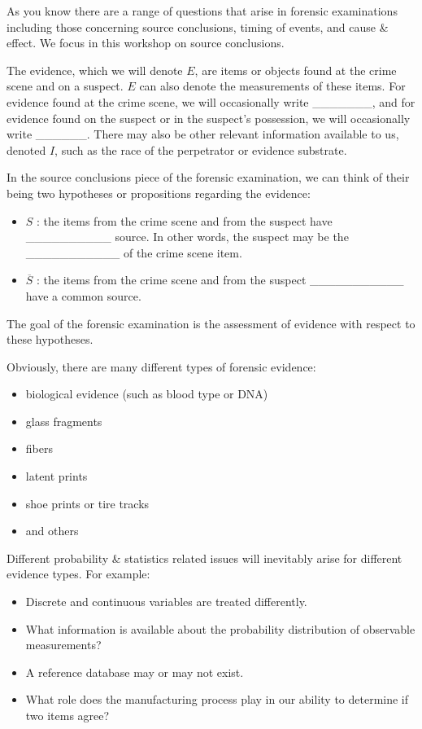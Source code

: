 \documentclass[]{book}
\providecommand{\tightlist}{%
  \setlength{\itemsep}{0pt}\setlength{\parskip}{0pt}}
\theoremstyle{definition}
\theoremstyle{definition}
\theoremstyle{remark}
\begin{document}
As you know there are a range of questions that arise in forensic
examinations including those concerning source conclusions, timing of
events, and cause \& effect. We focus in this workshop on source
conclusions.

The evidence, which we will denote \(E\), are items or objects found at
the crime scene and on a suspect. \(E\) can also denote the measurements
of these items. For evidence found at the crime scene, we will
occasionally write \_\_\_\_\_\_\_, and for evidence found on the suspect
or in the suspect's possession, we will occasionally write \_\_\_\_\_\_.
There may also be other relevant information available to us, denoted
\(I\), such as the race of the perpetrator or evidence substrate.

In the source conclusions piece of the forensic examination, we can
think of their being two hypotheses or propositions regarding the
evidence:

\begin{itemize}
\tightlist
\item
  \(S\) : the items from the crime scene and from the suspect have
  \_\_\_\_\_\_\_\_\_\_ source. In other words, the suspect may be the
  \_\_\_\_\_\_\_\_\_\_\_ of the crime scene item. \vspace{.1in}
\item
  \(\overline{S}\) : the items from the crime scene and from the suspect
  \_\_\_\_\_\_\_\_\_\_\_ have a common source.
\end{itemize}

The goal of the forensic examination is the assessment of evidence with
respect to these hypotheses.

Obviously, there are many different types of forensic evidence:

\begin{itemize}
\tightlist
\item
  biological evidence (such as blood type or DNA)
\item
  glass fragments
\item
  fibers
\item
  latent prints
\item
  shoe prints or tire tracks
\item
  and others
\end{itemize}

Different probability \& statistics related issues will inevitably arise
for different evidence types. For example:

\begin{itemize}
\tightlist
\item
  Discrete and continuous variables are treated differently.
\item
  What information is available about the probability distribution of
  observable measurements?
\item
  A reference database may or may not exist.
\item
  What role does the manufacturing process play in our ability to
  determine if two items agree?
\end{itemize}
\end{document}
